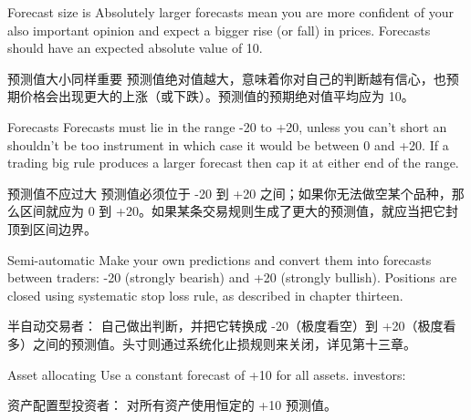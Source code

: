 \bipairgap

\begin{englishblock} Forecast size is Absolutely larger forecasts mean you are more confident of your also important opinion and expect a bigger rise (or fall) in prices. Forecasts should have an expected absolute value of 10. \end{englishblock}

\begin{chineseblock}预测值大小同样重要 预测值绝对值越大，意味着你对自己的判断越有信心，也预期价格会出现更大的上涨（或下跌）。预测值的预期绝对值平均应为 10。 \end{chineseblock}

\bipairgap

\begin{englishblock} Forecasts Forecasts must lie in the range -20 to +20, unless you can't short an shouldn't be too instrument in which case it would be between 0 and +20. If a trading big rule produces a larger forecast then cap it at either end of the range. \end{englishblock}

\begin{chineseblock}预测值不应过大 预测值必须位于 -20 到 +20 之间；如果你无法做空某个品种，那么区间就应为 0 到 +20。如果某条交易规则生成了更大的预测值，就应当把它封顶到区间边界。\end{chineseblock}

\bipairgap

\begin{englishblock} Semi-automatic Make your own predictions and convert them into forecasts between traders: -20 (strongly bearish) and +20 (strongly bullish). Positions are closed using systematic stop loss rule, as described in chapter thirteen. \end{englishblock}

\begin{chineseblock}半自动交易者： 自己做出判断，并把它转换成 -20（极度看空）到 +20（极度看多）之间的预测值。头寸则通过系统化止损规则来关闭，详见第十三章。\end{chineseblock}

\bipairgap

\begin{englishblock} Asset allocating Use a constant forecast of +10 for all assets. investors: \end{englishblock}

\begin{chineseblock}资产配置型投资者： 对所有资产使用恒定的 +10 预测值。\end{chineseblock}


